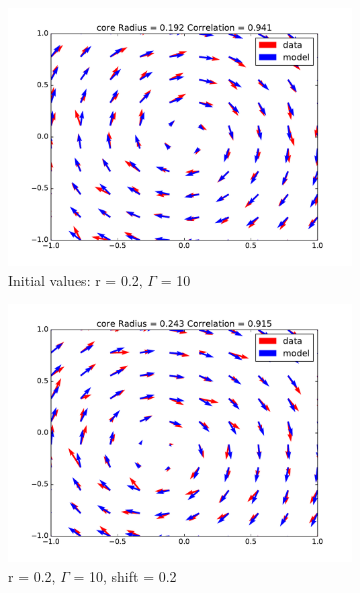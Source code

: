 \documentclass[12pt, a4paper, openany]{memoir}
\begin{document}
\begin{figure}[h!]
	\centering
	\begin{subfigure}[b]{0.45\textwidth}
		\centering
		\includegraphics[trim=40 20 40 20 ,clip, width=\textwidth]{figure/test_02_10N.pdf}
		\caption{Initial values: r = 0.2, $\Gamma$ = 10}
	\end{subfigure}
	\begin{subfigure}[b]{0.45\textwidth}
		\centering
		\includegraphics[trim=40 20 40 20 ,clip, width=\textwidth]{figure/test_02_10_02N.pdf}
		\caption{r = 0.2, $\Gamma$ = 10, shift = 0.2}
	\end{subfigure}
	\begin{subfigure}[b]{0.45\textwidth}
		\centering

\end{subfigure}
\end{figure}
\end{document}
